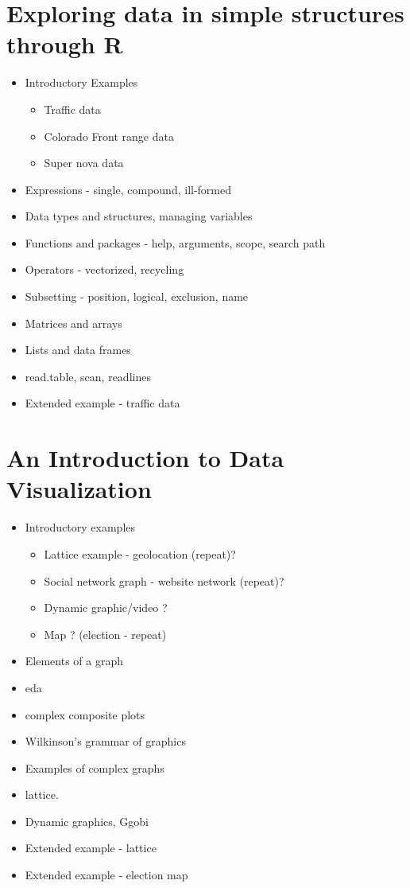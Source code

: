 \documentclass[11pt,timesroman]{article}
\begin{document}
\section{Exploring data in simple structures through R}
        \begin{itemize}
        \item Introductory Examples
          \begin{itemize}
            \item Traffic data
            \item Colorado Front range data
            \item Super nova data
          \end{itemize}
        \item Expressions - single, compound, ill-formed
        \item Data types and structures, managing variables
        \item Functions and packages - help, arguments, scope, search path
        \item Operators - vectorized, recycling
        \item Subsetting - position, logical, exclusion, name
        \item Matrices and arrays
        \item Lists and data frames
        \item read.table, scan, readlines
        \item Extended example - traffic data
        \end{itemize}


\section{An Introduction to Data Visualization}
        \begin{itemize}
          \item Introductory examples
            \begin{itemize}
              \item Lattice example - geolocation (repeat)?
              \item Social network graph - website network (repeat)?
              \item Dynamic graphic/video ?
              \item Map ? (election - repeat)
            \end{itemize}
        \item Elements of a graph
        \item eda
        \item complex composite plots
        \item Wilkinson's grammar of graphics
        \item Examples of complex graphs
        \item lattice.
        \item Dynamic graphics, Ggobi
        \item Extended example - lattice
        \item Extended example - election map
        \end{itemize}
\end{document}
